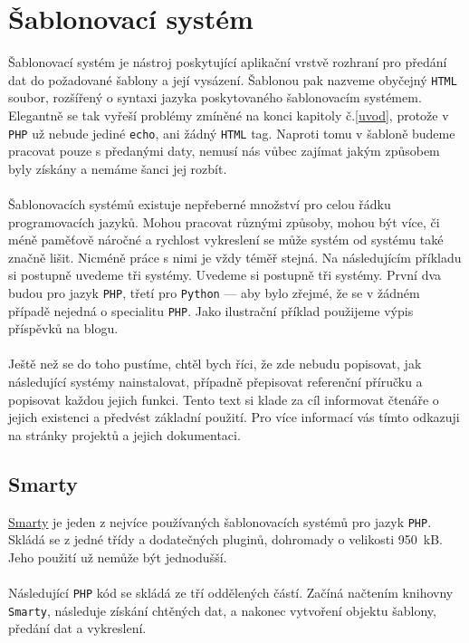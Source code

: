 \documentclass[10pt,a4paper]{article}
\begin{document}
	\section{Šablonovací systém}
		Šablonovací systém je nástroj poskytující aplikační vrstvě rozhraní pro předání dat do požadované šablony a její vysázení. Šablonou pak nazveme obyčejný \texttt{HTML} soubor, rozšířený o syntaxi jazyka poskytovaného šablonovacím systémem. Elegantně se tak vyřeší problémy zmíněné na konci kapitoly č.\ref{uvod}, protože v \texttt{PHP} už nebude jediné \texttt{echo}, ani žádný \texttt{HTML} tag. Naproti tomu v šabloně budeme pracovat pouze s předanými daty, nemusí nás vůbec zajímat jakým způsobem byly získány a nemáme šanci jej rozbít.
		\\
		\\
		Šablonovacích systémů existuje nepřeberné množství pro celou řádku programovacích jazyků. Mohou pracovat různými způsoby, mohou být více, či méně paměťově náročné a rychlost vykreslení se může systém od systému také značně lišit. Nicméně práce s nimi je vždy téměř stejná. Na následujícím příkladu si postupně uvedeme tři systémy. Uvedeme si postupně tři systémy. První dva budou pro jazyk \texttt{PHP}, třetí pro \texttt{Python} --- aby bylo zřejmé, že se v žádném případě nejedná o specialitu \texttt{PHP}. Jako ilustrační příklad použijeme výpis příspěvků na blogu.
		\\
		\\
		Ještě než se do toho pustíme, chtěl bych říci, že zde nebudu popisovat, jak následující systémy nainstalovat, případně přepisovat referenční příručku a popisovat každou jejich funkci. Tento text si klade za cíl informovat čtenáře o jejich existenci a předvést základní použití. Pro více informací vás tímto odkazuji na stránky projektů a jejich dokumentaci.
		
		\newpage
		\subsection{Smarty}
			\href{http://www.smarty.net}{Smarty} je jeden z nejvíce používaných šablonovacích systémů pro jazyk \texttt{PHP}. Skládá se z jedné třídy a dodatečných pluginů, dohromady o velikosti 950~kB. Jeho použití už nemůže být jednodušší.
			\\
			\\
			Následující \texttt{PHP} kód se skládá ze tří oddělených částí. Začíná načtením knihovny \texttt{Smarty}, následuje získání chtěných dat, a nakonec vytvoření objektu šablony, předání dat a vykreslení.
			
\end{document}
